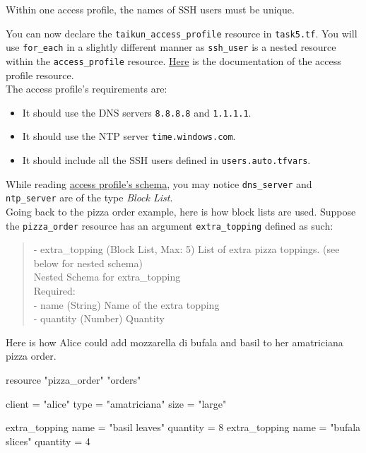 \begin{warn}
Within one access profile, the names of SSH users must be unique.
\end{warn}

You can now declare the \texttt{taikun\_access\_profile} resource in \texttt{task5.tf}.
You will use \texttt{for\_each} in a slightly different manner as \texttt{ssh\_user} is a nested resource
within the \texttt{access\_profile} resource.
\href{https://intuinewin.github.io/taikun-docs/resources/access_profile.html}{Here}
is the documentation of the access profile resource.\\

The access profile's requirements are:
\begin{itemize}
  \item It should use the DNS servers \texttt{8.8.8.8} and \texttt{1.1.1.1}.
  \item It should use the NTP server \texttt{time.windows.com}.
  \item It should include all the SSH users defined in \texttt{users.auto.tfvars}.
\end{itemize}

\begin{tip}
While reading \href{https://intuinewin.github.io/taikun-docs/resources/access_profile.html}{access profile's schema},
you may notice \texttt{dns\_server} and \texttt{ntp\_server} are of the type \textit{Block List}.\\

Going back to the pizza order example, here is how block lists are used.
Suppose the \texttt{pizza\_order} resource has an argument \texttt{extra\_topping} defined as such:
\begin{quote}
- extra\_topping (Block List, Max: 5) List of extra pizza toppings. (see below for nested schema)\\

Nested Schema for extra\_topping\\
Required:\\
- name (String) Name of the extra topping\\
- quantity (Number) Quantity
\end{quote}
Here is how Alice could add mozzarella di bufala and basil to her amatriciana pizza order.
\begin{tf}
resource "pizza_order" "orders" {
  client = "alice"
  type   = "amatriciana"
  size   = "large"

  extra_topping {
    name = "basil leaves"
    quantity = 8
  }
  extra_topping {
    name = "bufala slices"
    quantity = 4
  }
}
\end{tf}
\end{tip}
\pagebreak

